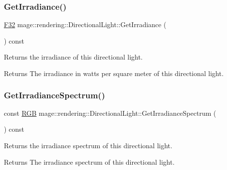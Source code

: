 \subsubsection{\texorpdfstring{Get\+Irradiance()}{GetIrradiance()}}
{\footnotesize\ttfamily \mbox{\hyperlink{namespacemage_aa97e833b45f06d60a0a9c4fc22ae02c0}{F32}} mage\+::rendering\+::\+Directional\+Light\+::\+Get\+Irradiance (\begin{DoxyParamCaption}{ }\end{DoxyParamCaption}) const\hspace{0.3cm}{\ttfamily [noexcept]}}

Returns the irradiance of this directional light.

\begin{DoxyReturn}{Returns}
The irradiance in watts per square meter of this directional light. 
\end{DoxyReturn}
\mbox{\label{classmage_1_1rendering_1_1_directional_light_a3a99d3d63a686f8bc587015115a85a81}} 
\subsubsection{\texorpdfstring{Get\+Irradiance\+Spectrum()}{GetIrradianceSpectrum()}}
{\footnotesize\ttfamily const \mbox{\hyperlink{structmage_1_1_r_g_b}{R\+GB}} mage\+::rendering\+::\+Directional\+Light\+::\+Get\+Irradiance\+Spectrum (\begin{DoxyParamCaption}{ }\end{DoxyParamCaption}) const\hspace{0.3cm}{\ttfamily [noexcept]}}

Returns the irradiance spectrum of this directional light.

\begin{DoxyReturn}{Returns}
The irradiance spectrum of this directional light. 
\end{DoxyReturn}
\mbox{\label{classmage_1_1rendering_1_1_directional_light_a865c8996fa02caf911718ac839435370}} 
